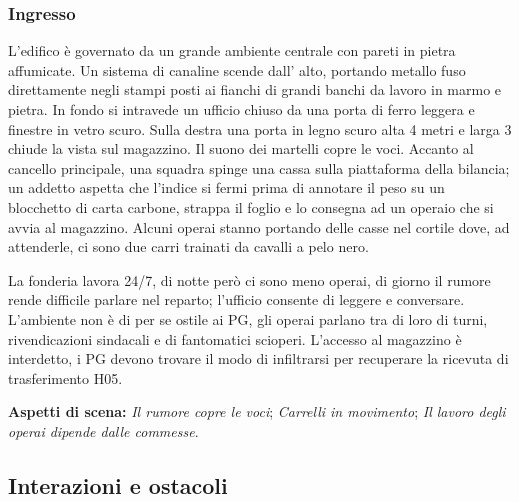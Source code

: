 \documentclass[11pt,a4paper]{article}
\newcommand{\aspect}[1]{\textit{\textcolor{blood}{#1}}}
\begin{document}
\subsubsection{Ingresso}
\begin{readaloud}
L'edifico è governato da un grande ambiente centrale con pareti in pietra affumicate. Un sistema di canaline scende dall' alto, portando metallo fuso direttamente negli stampi posti ai fianchi di grandi banchi da lavoro in marmo e pietra.
In fondo si intravede un ufficio chiuso da una porta di ferro leggera e finestre in vetro scuro. Sulla destra una porta in legno scuro alta 4 metri e larga 3 chiude la vista sul magazzino. 
Il suono dei martelli copre le voci. Accanto al cancello principale, una squadra spinge una cassa sulla piattaforma della bilancia; un addetto aspetta che l'indice si fermi prima di annotare il peso su un blocchetto di carta carbone, strappa il foglio e lo consegna ad un operaio che si avvia al magazzino. 
Alcuni operai stanno portando delle casse nel cortile dove, ad attenderle, ci sono due carri trainati da cavalli a pelo nero.

\end{readaloud}

\begin{gmbox}
La fonderia lavora 24/7, di notte però ci sono meno operai, di giorno il rumore rende difficile parlare nel reparto; l'ufficio consente di leggere e conversare. L'ambiente non è di per se ostile ai PG, gli operai parlano tra di loro di turni, rivendicazioni sindacali e di fantomatici scioperi. L'accesso al magazzino è interdetto, i PG devono trovare il modo di infiltrarsi per recuperare la ricevuta di trasferimento H05.
\end{gmbox}

\textbf{Aspetti di scena:} \aspect{Il rumore copre le voci}; \aspect{Carrelli in movimento}; \aspect{Il lavoro degli operai dipende dalle commesse}.

\subsection{Interazioni e ostacoli}
\end{document}
